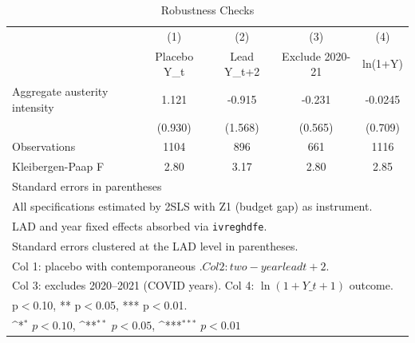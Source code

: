 \begin{table}[htbp]\centering
\def\sym#1{\ifmmode^{#1}\else\(^{#1}\)\fi}
\caption{Robustness Checks}
\begin{tabular}{l*{4}{c}}
\toprule
                    &\multicolumn{1}{c}{(1)}&\multicolumn{1}{c}{(2)}&\multicolumn{1}{c}{(3)}&\multicolumn{1}{c}{(4)}\\
                    &\multicolumn{1}{c}{Placebo Y\_t}&\multicolumn{1}{c}{Lead Y\_{t+2}}&\multicolumn{1}{c}{Exclude 2020-21}&\multicolumn{1}{c}{ln(1+Y)}\\
\midrule
Aggregate austerity intensity&       1.121         &      -0.915         &      -0.231         &     -0.0245         \\
                    &     (0.930)         &     (1.568)         &     (0.565)         &     (0.709)         \\
\midrule
Observations        &        1104         &         896         &         661         &        1116         \\
Kleibergen-Paap F   &        2.80         &        3.17         &        2.80         &        2.85         \\
\bottomrule
\multicolumn{5}{l}{\footnotesize Standard errors in parentheses}\\
\multicolumn{5}{l}{\footnotesize All specifications estimated by 2SLS with Z1 (budget gap) as instrument.}\\
\multicolumn{5}{l}{\footnotesize LAD and year fixed effects absorbed via \texttt{ivreghdfe}.}\\
\multicolumn{5}{l}{\footnotesize Standard errors clustered at the LAD level in parentheses.}\\
\multicolumn{5}{l}{\footnotesize Col 1: placebo with contemporaneous $. Col 2: two-year lead {t+2}$.}\\
\multicolumn{5}{l}{\footnotesize Col 3: excludes 2020--2021 (COVID years). Col 4: $\ln(1 + Y\_{t+1})$ outcome.}\\
\multicolumn{5}{l}{\footnotesize * p$<$0.10, ** p$<$0.05, *** p$<$0.01.}\\
\multicolumn{5}{l}{\footnotesize \sym{*} \(p<0.10\), \sym{**} \(p<0.05\), \sym{***} \(p<0.01\)}\\
\end{tabular}
\end{table}
